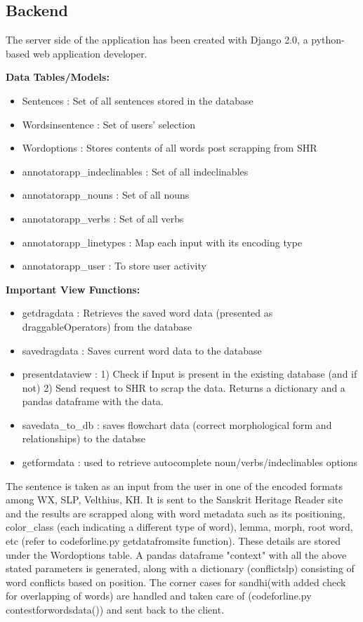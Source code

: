 \documentclass[12pt]{article}
\begin{document}
\subsection{Backend}
The server side of the application has been created with Django 2.0, a python-based web application developer.

\textbf{Data Tables/Models:}
\begin{itemize}
	\item Sentences : Set of all sentences stored in the database
	\item Wordsinsentence : Set of users' selection
	\item Wordoptions : Stores contents of all words post scrapping from SHR
	\item annotatorapp\_indeclinables : Set of all indeclinables
	\item annotatorapp\_nouns : Set of all nouns
	\item annotatorapp\_verbs : Set of all verbs
	\item annotatorapp\_linetypes : Map each input with its encoding type
	\item annotatorapp\_user : To store user activity 
\end{itemize}

\textbf{Important View Functions:}
\begin{itemize}
	\item  getdragdata : Retrieves the saved word data (presented as draggableOperators) from the database
	\item  savedragdata : Saves current word data to the database
	\item  presentdataview : 1) Check if Input is present in the existing database (and if not) 2) Send request to SHR to scrap the data. Returns a dictionary and a pandas dataframe with the data.
	\item  savedata\_to\_db : saves flowchart data (correct morphological form and relationships) to the databse
	\item  getformdata : used to retrieve autocomplete noun/verbs/indeclinables options
\end{itemize}

The sentence is taken as an input from the user in one of the encoded formats among WX, SLP, Velthius, KH. It is sent to the Sanskrit Heritage Reader site and the results are scrapped along with word metadata such as its positioning, color\_class (each indicating a different type of word), lemma, morph, root word, etc (refer to codeforline.py getdatafromsite function). These details are stored under the Wordoptions table. A pandas dataframe "context" with all the above stated parameters is generated, along with a dictionary (conflictslp) consisting of word conflicts based on position. The corner cases for sandhi(with added check for overlapping of words) are handled and taken care of (codeforline.py contestforwordsdata()) and sent back to the client.
\end{document}
